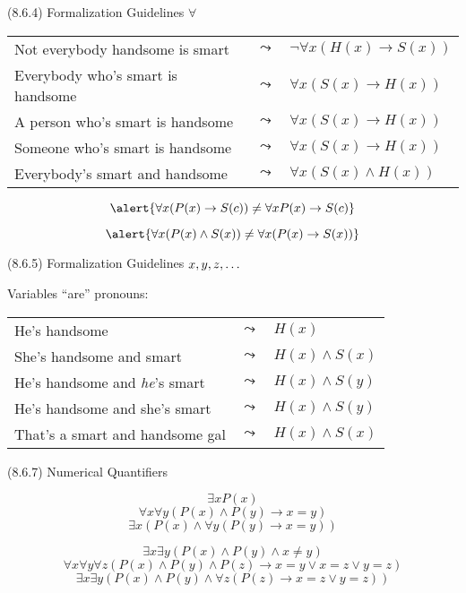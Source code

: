 \begin{frame}{(8.6.4) Formalization Guidelines $\forall$}

\begin{tabular}{p{6cm} c l}
		
		Not everybody handsome is smart & $\leadsto$ & $\neg\forall x(H(x)\to S(x))$\\
Everybody who's smart is handsome & $\leadsto$ &$\forall x(S(x)\to H(x))$\\
A person who's smart is handsome & $\leadsto$ &$\forall x(S(x)\to H(x))$\\
Someone who's smart is handsome & $\leadsto$ &$\forall x(S(x)\to H(x))$\\
Everybody's smart and handsome & $\leadsto$ &$\forall x(S(x)\land H(x))$
		\end{tabular}
		
		\vspace{4ex}
		
		\[\alert{\forall x(P(x)\to S(c))\neq \forall xP(x)\to S(c)}\]
		
		\[\alert{\forall x(P(x)\land S(x))\neq \forall x(P(x)\to S(x))}\]

\end{frame}

\begin{frame}{(8.6.5) Formalization Guidelines $x,y,z,\mathellipsis$}

Variables ``are'' pronouns:

\vspace{4ex}

\begin{tabular}{p{6cm} c l}
		He's handsome & $\leadsto$ & $H(x)$\\
		She's handsome and smart & $\leadsto$ & $H(x)\land S(x)$\\
		He's handsome and \emph{he}'s smart & $\leadsto$ & $H(x)\land S(y)$\\
		He's handsome and she's smart & $\leadsto$ & $H(x)\land S(y)$\\
		That's a smart and handsome gal & $\leadsto$ & $H(x)\land S(x)$\\
		
		
		\end{tabular}

\end{frame}

\begin{frame}{(8.6.7) Numerical Quantifiers}

\[\exists xP(x)\tag{Exists$_1$}\]
\[\forall x\forall y(P(x)\land P(y)\to x=y)\tag{At Most$_1$}\]
\[\exists x(P(x)\land \forall y(P(y)\to x=y))\tag{Exactly$_1$}\]

\[\exists x\exists y(P(x)\land P(y)\land x\neq y)\tag{Exists$_2$}\]
\[\forall x\forall y\forall z(P(x)\land P(y)\land P(z)\to x=y\lor x=z\lor y=z)\tag{At Most$_2$}\]
\[\exists x\exists y(P(x)\land P(y)\land \forall z(P(z)\to x=z\lor y=z))\tag{Exactly$_2$}\]
\end{frame}

